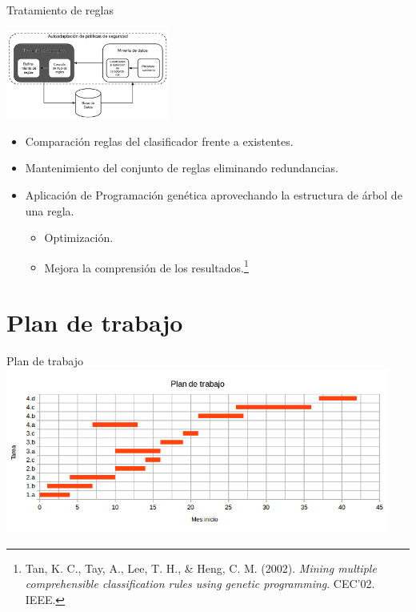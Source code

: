 \documentclass{beamer}
\begin{document}
\begin{frame}{Tratamiento de reglas}

\begin{center}
\includegraphics[width=0.4\textwidth]{./imgs/KRS2.png}
\end{center}

\begin{itemize}
  \item Comparación reglas del clasificador frente a existentes.
  \item Mantenimiento del conjunto de reglas eliminando redundancias.
  \item Aplicación de Programación genética aprovechando la estructura de árbol de una regla.
  \begin{itemize}
    \item Optimización.
    \item Mejora la comprensión de los resultados.\footnote{Tan, K. C., Tay, A., Lee, T. H., \& Heng, C. M. (2002). \textit{Mining multiple comprehensible classification rules using genetic programming}. CEC'02. IEEE.}
  \end{itemize}
\end{itemize}

\end{frame}

\section{Plan de trabajo}

\begin{frame}{Plan de trabajo}
\includegraphics[width=0.95\textwidth]{./imgs/especiedegantt.png}
\end{frame}
\end{document}
